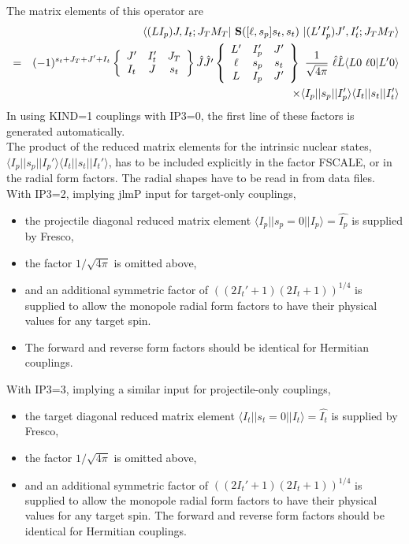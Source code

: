 \documentclass[11pt]{article}
\begin{document}
The  matrix elements of this operator are
\begin{eqnarray}
&& \langle(LI_p)J,I_t;J_TM_T | ~{\bf S}([\ell,s_p]s_t,s_t) ~| (L'I_p')J',I_t';J_TM_T \rangle
   \nonumber \\
& = &  (-1)^{s_t+J_T+J'+I_t}
   \left\{ \begin{array}{ccc}
    J'  & I_t' & J_T \\
    I_t & J    & s_t \\
    \end{array} \right\}   \hat{J} \hat{J'}
    \left\{ \begin{array}{ccc}
    L' & I_p' & J'  \\
    \ell & s_p & s_t  \\
    L & I_p & J'  \\
    \end{array} \right\}  ~
     \frac{1}{\sqrt{4\pi}} ~ \hat{\ell} \hat{L} \langle L 0 \ \ell 0 | L'0 \rangle   \nonumber \\
    &  &   \times \langle I_p||s_p||I_p'\rangle \langle I_t||s_t||I_t'\rangle
\end{eqnarray}
In using KIND=1 couplings with IP3=0, the first line of these factors is generated automatically. \\
The product of the
reduced matrix elements for the intrinsic nuclear states,
$\langle I_p||s_p||I_p'\rangle \langle I_t||s_t||I_t'\rangle$,
 has to be included explicitly in the factor FSCALE,
 or in the radial form factors.
The radial shapes have to be read in from data files.\\

With IP3=2, implying jlmP input for target-only couplings,
\begin{itemize}
\item
 the projectile diagonal reduced matrix element
$\langle I_p||s_p=0||I_p\rangle = \hat{I_p}$ is supplied by Fresco,
\item
the factor $1/\sqrt{4\pi}$ is omitted above,
\item
and an additional symmetric factor of
$((2I_t'+1)(2I_t+1))^{1/4}$
is supplied to allow the
monopole radial form factors to have their physical
values for any target spin.
\item
The forward and reverse form factors should be identical for Hermitian couplings.

\end{itemize}
With IP3=3, implying a similar input for projectile-only couplings,
\begin{itemize}
\item
 the target diagonal reduced matrix element
 $\langle I_t||s_t=0||I_t\rangle = \hat{I_t}$ is supplied by Fresco,
 \item
 the factor $1/\sqrt{4\pi}$ is omitted above,
 \item
 and an additional symmetric factor of $((2I_t'+1)(2I_t+1))^{1/4}$
 is supplied to allow the monopole radial form factors to have their physical
 values for any target spin.
 The forward and reverse form factors should be identical for Hermitian couplings.
\end{itemize}

%
\end{document}
